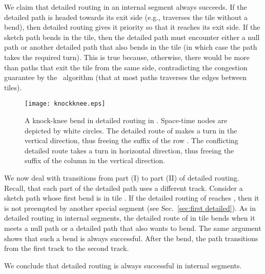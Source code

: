 \documentclass[11pt]{article}
\newcommand{\route}{\text{\sc{ipp}}}
\newcommand{\IPP}{\route}
\newenvironment{proof sketch}[1]{\noindent {\emph{Proof sketch of #1:}}}{\hfill \qed}
\begin{document}
We claim that detailed routing in an internal segment always succeeds.  If the
detailed path is headed towards its exit side (e.g., traverses the tile without a
bend), then detailed routing gives it priority so that it reaches its exit
side.  If the sketch path bends in the tile, then the detailed path must encounter
either a null path or another detailed path that also bends in the tile (in which
case the path takes the required turn). This is true because, otherwise, there would
be more than  paths that exit the tile from the same side, contradicting the
congestion guarantee by the \IPP\ algorithm (that at most  paths traverses the edges
between tiles).

\begin{figure}[H]
  \centering
    \texttt{[image: knockknee.eps]}
  \caption{A knock-knee bend in detailed routing in . Space-time nodes are depicted by white circles. The detailed route of  makes a turn in the vertical direction, thus freeing the suffix of the row . The conflicting detailed route takes a turn in horizontal direction, thus freeing the suffix of the column in the vertical direction.}
    \label{fig:knockknee}
\end{figure}


We now deal with transitions from part (I) to part (II) of detailed routing.
Recall, that each part of the detailed path uses a different track.
Consider a sketch path  whose first bend is in tile .
If the detailed routing of  reaches , then it is not preempted by
another special segment (see Sec.~\ref{sec:first detailed}).
As in detailed routing in internal segments, the detailed route of  in tile
 bends when it meets a null path or a detailed path that also wants to bend.
The same argument shows that such a bend is always successful.
After the bend, the path transitions from the first track to the second track.

We conclude that detailed routing is always successful in internal
segments.
\begin{comment}
We claim that detailed routing in internal segments is always successful also for
partial tiles.  This is true because straight paths (``rays'') are unblocked in
partial tiles, and if a turn needs to take place, then all  ``crossings'' exist
even if the tile is a partial tile. See Figure~\ref{fig:turn in partial tile} for a depiction of detailed
routing in partial tiles.




\begin{figure}[H]
  \centering
    \texttt{[image: detailedint.eps]}
    \caption{Detailed routing in internal segments for partial tiles. Although the
      tiles are partial, detailed routing works as if the tiles are complete. Two
      prefixes of detailed routing are depicted in the figure by black and grey
      curves. The top path is a first segment and the bottom path bends in a partial
      tile. Note that all possible crossings in the tile in which the bend takes
      place exist in the partial tile.}
\label{fig:turn in partial tile}
\end{figure}

\end{comment}
\end{document}
